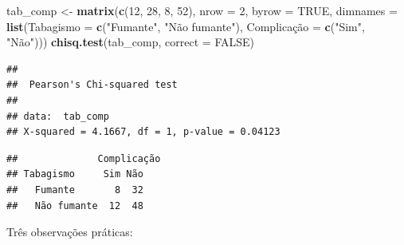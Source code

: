 \documentclass[
]{book}
\newenvironment{Shaded}{\begin{snugshade}}{\end{snugshade}}
\newcommand{\AttributeTok}[1]{\textcolor[rgb]{0.13,0.29,0.53}{#1}}
\newcommand{\ConstantTok}[1]{\textcolor[rgb]{0.56,0.35,0.01}{#1}}
\newcommand{\DecValTok}[1]{\textcolor[rgb]{0.00,0.00,0.81}{#1}}
\newcommand{\FunctionTok}[1]{\textcolor[rgb]{0.13,0.29,0.53}{\textbf{#1}}}
\newcommand{\NormalTok}[1]{#1}
\newcommand{\OtherTok}[1]{\textcolor[rgb]{0.56,0.35,0.01}{#1}}
\newcommand{\SpecialCharTok}[1]{\textcolor[rgb]{0.81,0.36,0.00}{\textbf{#1}}}
\newcommand{\StringTok}[1]{\textcolor[rgb]{0.31,0.60,0.02}{#1}}
\begin{document}
\begin{Shaded}
\begin{Highlighting}[]
\NormalTok{tab\_comp }\OtherTok{\textless{}{-}} \FunctionTok{matrix}\NormalTok{(}\FunctionTok{c}\NormalTok{(}\DecValTok{12}\NormalTok{, }\DecValTok{28}\NormalTok{, }\DecValTok{8}\NormalTok{, }\DecValTok{52}\NormalTok{), }\AttributeTok{nrow =} \DecValTok{2}\NormalTok{, }\AttributeTok{byrow =} \ConstantTok{TRUE}\NormalTok{,}
                   \AttributeTok{dimnames =} \FunctionTok{list}\NormalTok{(}\AttributeTok{Tabagismo =} \FunctionTok{c}\NormalTok{(}\StringTok{"Fumante"}\NormalTok{, }\StringTok{"Não fumante"}\NormalTok{),}
\NormalTok{                                   Complicação }\OtherTok{=} \FunctionTok{c}\NormalTok{(}\StringTok{"Sim"}\NormalTok{, }\StringTok{"Não"}\NormalTok{)))}
\FunctionTok{chisq.test}\NormalTok{(tab\_comp, }\AttributeTok{correct =} \ConstantTok{FALSE}\NormalTok{)}
\end{Highlighting}
\end{Shaded}

\begin{verbatim}
## 
##  Pearson's Chi-squared test
## 
## data:  tab_comp
## X-squared = 4.1667, df = 1, p-value = 0.04123
\end{verbatim}

\begin{Shaded}
\end{Shaded}

\begin{verbatim}
##              Complicação
## Tabagismo     Sim Não
##   Fumante       8  32
##   Não fumante  12  48
\end{verbatim}

Três observações práticas:
\end{document}
